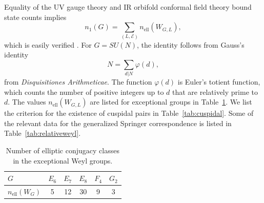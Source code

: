 \documentclass[12pt]{article}
\numberwithin{equation}{section}%
\theoremstyle{definition}
\DeclareMathOperator{\elliptic}{ell}
\begin{document}
Equality of the UV gauge theory and IR orbifold conformal field theory bound state counts implies
\begin{equation*}
n_1(G) = \sum_{(L, \mathcal{E})} n_{\elliptic}(W_{G,L}),
\end{equation*}
which is easily verified \cite{MR1369407}.  For $G = SU(N)$, the identity follows from Gauss's identity
\begin{equation*}
N = \sum_{d | N} \varphi(d),
\end{equation*}
from {\it Disquisitiones Arithmeticae}.
The function $\varphi(d)$ is Euler's totient function, which counts the number of positive integers up to $d$ that are relatively prime to $d$.
The values $n_{\elliptic}(W_{G,L})$ are listed for exceptional groups in Table~\ref{tab:ellipticweyl}.
We list the criterion for the existence of cuspidal pairs in Table~\ref{tab:cuspidal}.  Some of the relevant data for the generalized Springer correspondence is listed in Table~\ref{tab:relativeweyl}.

\begin{table}[htbp]
\centering
\small
\begin{tabular}{lccccc}
\toprule
$G$ & $E_6$ & $E_7$ & $E_8$ & $F_4$ & $G_2$ \\
\midrule
$n_{\elliptic}(W_G)$ & 5 & 12 & 30 & 9 & 3 \\
\bottomrule
\end{tabular}
\caption{Number of elliptic conjugacy classes in the exceptional Weyl groups.}
\label{tab:ellipticweyl}
\end{table}
\end{document}
